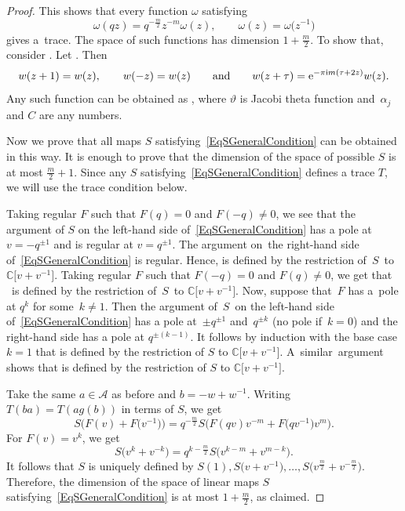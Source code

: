 \documentclass[pdftex]{sigma}
\newcommand\CC{\mathbb{C}}
\newcommand{\mc}{\mathcal}
\numberwithin{equation}{section}
\theoremstyle{definition}
\begin{document}
\begin{proof}
 This shows that every function $\omega$ satisfying
 \[
 \omega(qz)=q^{-\frac{m}{2}}z^{-m}\omega(z) , \qquad \omega(z)=\omega\bigl(z^{-1}\bigr)
 \]
gives a~trace. The space of such functions has dimension $1+\frac{m}{2}$. To show that, consider . Let . Then
\[
w(z+1)=w(z) , \qquad w(-z)=w(z) \qquad \text{and} \qquad w(z+\tau)={\rm e}^{-\pi \mathrm{i} m(\tau+2z)}w(z).
\]
 Any such function can be obtained as , where $\vartheta$ is Jacobi theta function and~$\alpha_j$ and $C$ are any numbers. %

 Now we prove that all maps $S$ satisfying~\eqref{EqSGeneralCondition} can be obtained in this way. It is enough to prove that the dimension of the space of possible $S$ is at most $\frac{m}{2}+1$. Since any $S$ satisfying~\eqref{EqSGeneralCondition} defines a trace $T$, we will use the trace condition below.

 Taking regular $F$ such that $F(q)=0$ and $F(-q)\neq 0$, we see that the argument of $S$ on the left-hand side of~\eqref{EqSGeneralCondition} has a pole at $v=-q^{\pm 1}$ and is regular at $v=q^{\pm 1}$. The argument on~the right-hand side of~\eqref{EqSGeneralCondition} is regular. Hence,  is defined by the restriction of~$S$~to $\CC\big[v+v^{-1}\big]$. Taking regular $F$ such that $F(-q)=0$ and $F(q)\neq 0$, we get that ~is defined by the restriction of~$S$~to $\CC\big[v+v^{-1}\big]$. Now, suppose that~$F$ has a~pole at $q^k$ for some~$k\neq 1$. Then the argument of~$S$~on the left-hand side of~\eqref{EqSGeneralCondition} has a pole at~$\pm q^{\pm 1}$ and~$q^{\pm k}$ (no pole if~${k=0}$) and the right-hand side has a pole at $q^{\pm(k-1)}$. It follows by induction with the base case $k=1$ that  is defined by the restriction of $S$ to $\CC\big[v+v^{-1}\big]$. A~similar~argument shows that  is defined by the restriction of $S$ to $\CC\big[v+v^{-1}\big]$.

 Take the same $a\in\mc{A}$ as before and $b=-w+w^{-1}$. Writing $T(ba)=T(ag(b))$ in terms of $S$, we get
 \[S\bigl(F(v)+F\bigl(v^{-1}\bigr)\bigr)=q^{-\tfrac m2}S\bigl(F(qv)v^{-m}+F\bigl(qv^{-1}\bigr)v^m\bigr).\]
 For $F(v)=v^k$, we get
\[
S\bigl(v^k+v^{-k}\bigr)=q^{k-\tfrac m2}S\bigl(v^{k-m}+v^{m-k}\bigr).
\]
 It follows that $S$ is uniquely defined by $S(1), S\bigl(v+v^{-1}\bigr),\dots, S\bigl(v^{\frac{m}{2}}+v^{-\frac{m}{2}}\bigr)$. Therefore, the dimension of the space of linear maps $S$ satisfying~\eqref{EqSGeneralCondition} is at most $1+\frac{m}{2}$, as claimed.
\end{proof}
\end{document}
